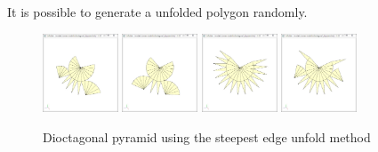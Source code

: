 \documentclass[11pt, letterpaper]{article}
\begin{document}
It is possible to generate a unfolded polygon randomly.
\begin{figure}[th]
\centering
\includegraphics[width=0.2\textwidth]{FIGS/dioctagonal_pyramid_s1.jpg}
\hspace{5mm}
\includegraphics[width=0.2\textwidth]{FIGS/dioctagonal_pyramid_s2.jpg}
\hspace{5mm}
\includegraphics[width=0.2\textwidth]{FIGS/dioctagonal_pyramid_s3.jpg}
\hspace{5mm}
\includegraphics[width=0.2\textwidth]{FIGS/dioctagonal_pyramid_s4.jpg}
\caption{Dioctagonal pyramid using the steepest edge unfold method}
\end{figure}

\end{document}
